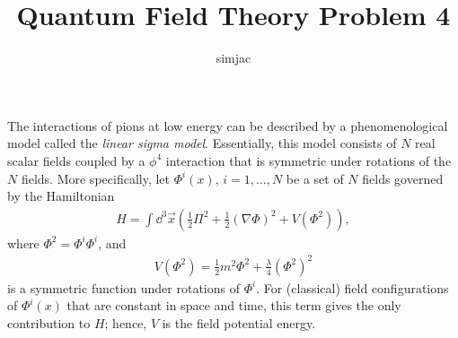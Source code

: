 

\usepackage{simpler-wick} %
\usepackage[compat=1.1.0]{tikz-feynman} %

\renewcommand{\thesection}{\alph{section})}
\renewcommand{\thesubsection}{\alph{section}.\roman{subsection})}


\title{{\Huge {}} Quantum Field Theory Problem 4 {\Huge {}}}
\author{simjac}
\date{}



\maketitle


The interactions of pions at low energy can be described by a phenomenological model called the \emph{linear sigma model}. Essentially, this model consists of $N$ real scalar fields coupled by a $\phi^4$ interaction that is symmetric under rotations of the $N$ fields. More specifically, let $\Phi^i(x)$, $i = 1, \dots, N$ be a set of $N$ fields governed by the Hamiltonian
\begin{align}\label{eq:linear_sigma_hamiltonian}
    H = \int \dd^3 \Vec{x} \left( \frac{1}{2} \Pi^2 + \frac{1}{2} (\nabla \Phi)^2 + V(\Phi^2) \right),
\end{align}{}
where $\Phi^2 = \Phi^i \Phi^i$, and
\begin{align}\label{eq:linear_sigma_potential}
    V(\Phi^2) = \frac{1}{2} m^2 \Phi^2 + \frac{\lambda}{4} (\Phi^2)^2
\end{align}{}
is a symmetric function under rotations of $\Phi^i$. For (classical) field configurations of $\Phi^i(x)$ that are constant in space and time, this term gives the only contribution to $H$; hence, $V$ is the field potential energy.

